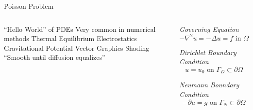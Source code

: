 \begin{frame}{Poisson Problem}
\begin{columns}
\centering
\begin{outline}
  \1 ``Hello World'' of PDEs
  \1 Very common in numerical methods 
  \2 Thermal Equilibrium
  \2 Electrostatics
  \2 Gravitational Potential
  \2 Vector Graphics Shading
  \1 ``Smooth until diffusion equalizes''
\end{outline}

\begin{center}
  {\tiny \textit{Governing Equation}}
  $$
    -\nabla^2 u = -\Delta u = f \text{ in } \Omega
  $$

  {\tiny \textit{Dirichlet Boundary Condition}}
  $$
    u = u_0 \text{ on } \Gamma_D \subset \partial \Omega
  $$

  {\tiny \textit{Neumann Boundary Condition}}
  $$
    -\partial u = g \text{ on } \Gamma_N \subset \partial \Omega
  $$
\end{center}
\end{columns}
\end{frame}



